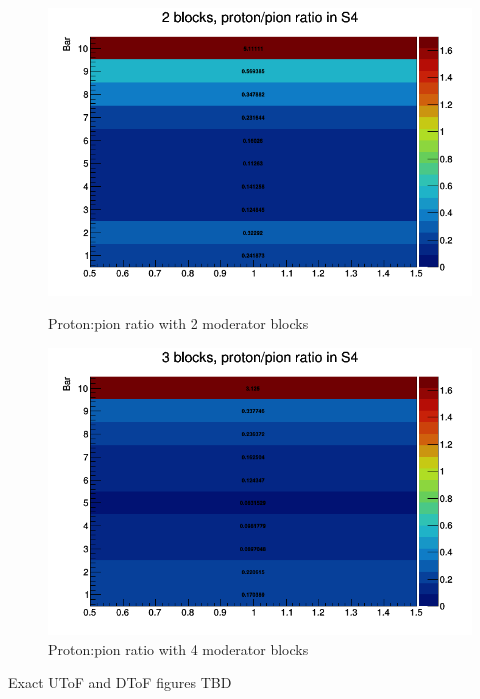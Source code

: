 \begin{figure}[ht]
\begin{minipage}[t]{0.48\textwidth}
    		\centering
    		\includegraphics[width=\textwidth]{files/Figures/2blocks_propiratio_vert}
    		\caption{Proton:pion ratio with 2 moderator blocks}
    		\label{fig:2blocks_propiratio_vert}
    	\end{minipage}
    	\hspace{0.3cm}
    	\begin{minipage}[t]{0.48\textwidth}
    		\centering
    		\includegraphics[width=\textwidth]{files/Figures/3blocks_propiratio_vert}
    		\caption{Proton:pion ratio with 4 moderator blocks}
    		\label{fig:4blocks_propiratio_vert}
    	\end{minipage}
   	\end{figure}
	

Exact UToF and DToF figures TBD
